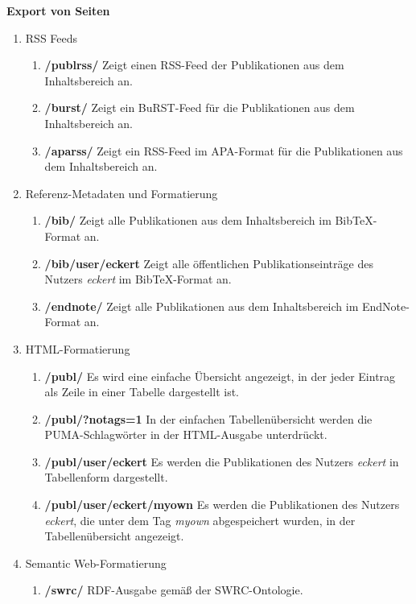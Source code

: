 \textbf{Export von Seiten}
\begin{enumerate}
    \item RSS Feeds
    \begin{enumerate}
        \item \textbf{/publrss/} \newline
        Zeigt einen RSS-Feed der Publikationen aus dem Inhaltsbereich an.
        \item \textbf{/burst/} \newline
        Zeigt ein BuRST-Feed für die Publikationen aus dem Inhaltsbereich an.
        \item \textbf{/aparss/} \newline
        Zeigt ein RSS-Feed im APA-Format für die Publikationen aus dem Inhaltsbereich an.
    \end{enumerate}
    \item Referenz-Metadaten und Formatierung
    \begin{enumerate}
        \item \textbf{/bib/} \newline
        Zeigt alle Publikationen aus dem Inhaltsbereich im BibTeX-Format an.
        \item \textbf{/bib/user/eckert} \newline
        Zeigt alle öffentlichen Publikationseinträge des Nutzers \textit{eckert} im BibTeX-Format an.
        \item \textbf{/endnote/} \newline
        Zeigt alle Publikationen aus dem Inhaltsbereich im EndNote-Format an.
    \end{enumerate}
    \item HTML-Formatierung
    \begin{enumerate}
        \item \textbf{ /publ/} \newline
        Es wird eine einfache Übersicht angezeigt, in der jeder Eintrag als Zeile in einer Tabelle dargestellt ist.
        \item \textbf{/publ/?notags=1} \newline
        In der einfachen Tabellenübersicht werden die PUMA-Schlagwörter in der HTML-Ausgabe unterdrückt.
        \item \textbf{/publ/user/eckert} \newline
        Es werden die Publikationen des Nutzers \textit{eckert} in Tabellenform dargestellt.
        \item \textbf{ /publ/user/eckert/myown} \newline
        Es werden die Publikationen des Nutzers \textit{eckert}, die unter dem Tag \textit{myown} abgespeichert wurden, in der Tabellenübersicht angezeigt. 
    \end{enumerate}
    \item Semantic Web-Formatierung
    \begin{enumerate}
        \item \textbf{/swrc/} \newline
        RDF-Ausgabe gemäß der SWRC-Ontologie.
    \end{enumerate}
\end{enumerate}

